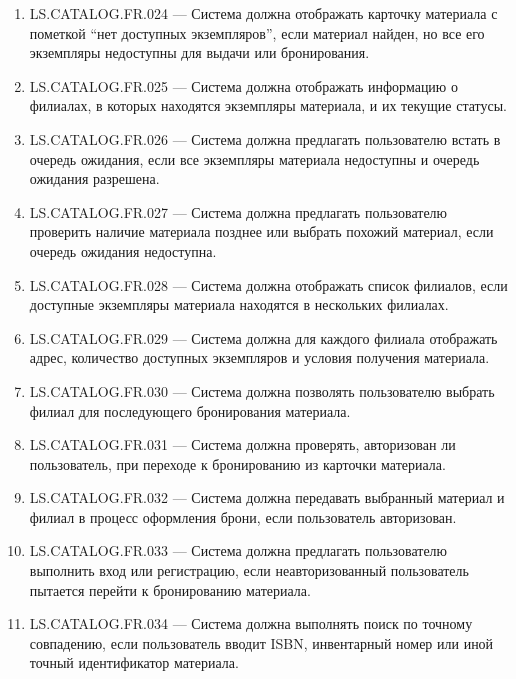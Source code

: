 \documentclass[12pt,a4paper]{article}
\begin{document}
\begin{enumerate}
		\item LS.CATALOG.FR.024 --- Система должна отображать карточку материала
		с пометкой ``нет доступных экземпляров'', если материал найден, но все его
		экземпляры недоступны для выдачи или бронирования.
		
		\item LS.CATALOG.FR.025 --- Система должна отображать информацию о филиалах,
		в которых находятся экземпляры материала, и их текущие статусы.
		
		\item LS.CATALOG.FR.026 --- Система должна предлагать пользователю встать
		в очередь ожидания, если все экземпляры материала недоступны и очередь
		ожидания разрешена.
		
		\item LS.CATALOG.FR.027 --- Система должна предлагать пользователю проверить
		наличие материала позднее или выбрать похожий материал, если очередь ожидания
		недоступна.
		
		\item LS.CATALOG.FR.028 --- Система должна отображать список филиалов, если
		доступные экземпляры материала находятся в нескольких филиалах.
		
		\item LS.CATALOG.FR.029 --- Система должна для каждого филиала отображать
		адрес, количество доступных экземпляров и условия получения материала.
		
		\item LS.CATALOG.FR.030 --- Система должна позволять пользователю выбрать
		филиал для последующего бронирования материала.
		
		\item LS.CATALOG.FR.031 --- Система должна проверять, авторизован ли
		пользователь, при переходе к бронированию из карточки материала.
		
		\item LS.CATALOG.FR.032 --- Система должна передавать выбранный материал
		и филиал в процесс оформления брони, если пользователь авторизован.
		
		\item LS.CATALOG.FR.033 --- Система должна предлагать пользователю выполнить
		вход или регистрацию, если неавторизованный пользователь пытается перейти
		к бронированию материала.
		
		\item LS.CATALOG.FR.034 --- Система должна выполнять поиск по точному
		совпадению, если пользователь вводит ISBN, инвентарный номер или иной точный
		идентификатор материала.
		

\end{enumerate}
\end{document}
